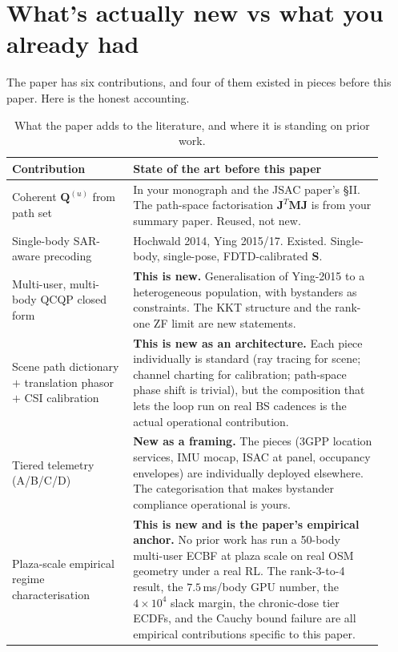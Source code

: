 \documentclass[11pt]{article}
\newcommand{\Qmat}{\mathbf{Q}}
\newcommand{\Mmat}{\mathbf{M}}
\newcommand{\Jmat}{\mathbf{J}}
\begin{document}
\section{What's actually new vs what you already had}

The paper has six contributions, and four of them existed in pieces
before this paper. Here is the honest accounting.

\begin{table}[!h]
\centering
\small
\begin{tabular}{@{}p{0.30\linewidth}p{0.62\linewidth}@{}}
\toprule
Contribution & State of the art before this paper \\
\midrule
Coherent $\Qmat^{(u)}$ from path set & In your monograph and the JSAC paper's §II. The path-space factorisation $\Jmat^T \Mmat \Jmat$ is from your summary paper. Reused, not new. \\
Single-body SAR-aware precoding & Hochwald 2014, Ying 2015/17. Existed. Single-body, single-pose, FDTD-calibrated $\mathbf{S}$. \\
Multi-user, multi-body QCQP closed form & \textbf{This is new.} Generalisation of Ying-2015 to a heterogeneous population, with bystanders as constraints. The KKT structure and the rank-one ZF limit are new statements. \\
Scene path dictionary $+$ translation phasor $+$ CSI calibration & \textbf{This is new as an architecture.} Each piece individually is standard (ray tracing for scene; channel charting for calibration; path-space phase shift is trivial), but the composition that lets the loop run on real BS cadences is the actual operational contribution. \\
Tiered telemetry (A/B/C/D) & \textbf{New as a framing.} The pieces (3GPP location services, IMU mocap, ISAC at panel, occupancy envelopes) are individually deployed elsewhere. The categorisation that makes bystander compliance operational is yours. \\
Plaza-scale empirical regime characterisation & \textbf{This is new and is the paper's empirical anchor.} No prior work has run a 50-body multi-user ECBF at plaza scale on real OSM geometry under a real RL. The rank-3-to-4 result, the $7.5\,$ms/body GPU number, the $4\times 10^4$ slack margin, the chronic-dose tier ECDFs, and the Cauchy bound failure are all empirical contributions specific to this paper. \\
\bottomrule
\end{tabular}
\caption{What the paper adds to the literature, and where it is
standing on prior work.}
\end{table}
\end{document}
